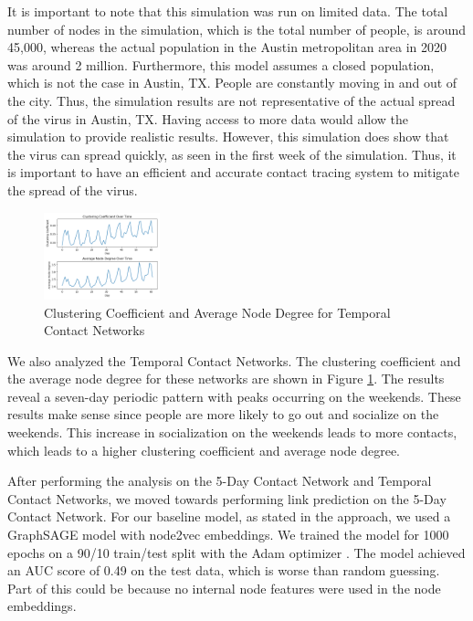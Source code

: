 \documentclass[times, 10pt,twocolumn]{article}
\begin{document}
It is important to note that this simulation was run on limited data. The total number of nodes in the simulation, which is the total number of people, is around 45,000, whereas the actual population in the Austin metropolitan area in 2020 was around 2 million. Furthermore, this model assumes a closed population, which is not the case in Austin, TX. People are constantly moving in and out of the city. Thus, the simulation results are not representative of the actual spread of the virus in Austin, TX.  Having access to more data would allow the simulation to provide realistic results. However, this simulation does show that the virus can spread quickly, as seen in the first week of the simulation. Thus, it is important to have an efficient and accurate contact tracing system to mitigate the spread of the virus.

\begin{figure}[h]
    \centering
    \includegraphics[width=0.3\textwidth]{imgs/temporal_network_analysis.png}
    \caption{Clustering Coefficient and Average Node Degree for Temporal Contact Networks} 
    \label{fig:temporal_stats}
\end{figure}

We also analyzed the Temporal Contact Networks. The clustering coefficient and the average node degree for these networks are shown in Figure \ref{fig:temporal_stats}. The results reveal a seven-day periodic pattern with peaks occurring on the weekends. These results make sense since people are more likely to go out and socialize on the weekends. This increase in socialization on the weekends leads to more contacts, which leads to a higher clustering coefficient and average node degree.

After performing the analysis on the 5-Day Contact Network and Temporal Contact Networks, we moved towards performing link prediction on the 5-Day Contact Network. For our baseline model, as stated in the approach, we used a GraphSAGE model with node2vec embeddings. We trained the model for 1000 epochs on a 90/10 train/test split with the Adam optimizer \cite{kingma2017adam}. The model achieved an AUC score of 0.49 on the test data, which is worse than random guessing. Part of this could be because no internal node features were used in the node embeddings.
\end{document}
